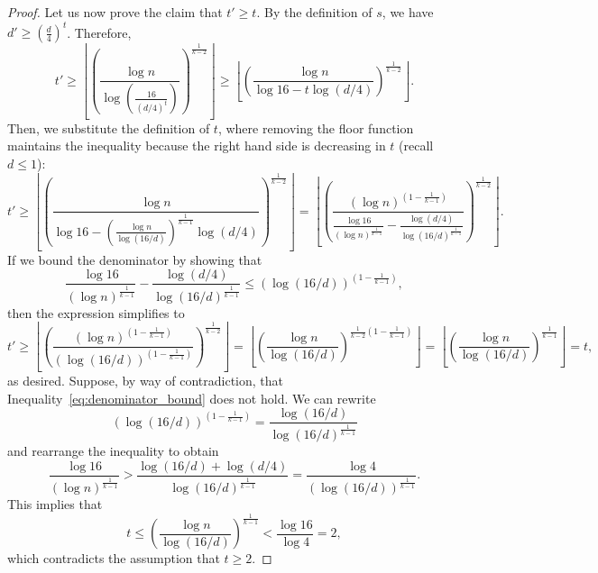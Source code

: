 \begin{theorem}
\begin{proof}
        Let us now prove the claim that $t' \geq t$.
        By the definition of $s$, we have $d' \geq \left( \frac{d}{4} \right)^t$.
        Therefore,
        \[
            t' \geq
            \left\lfloor \left(  \frac{\log n}{\log \left(\frac{16}{(d/4)^t}\right)} \right)^
            {\frac{1}{k-2}} \right\rfloor \geq
            \left\lfloor \left(  \frac{\log n}{\log 16 - t \log (d/4)} \right)^
            {\frac{1}{k-2}} \right\rfloor.
        \]
        Then, we substitute the definition of $t$, where removing the floor function
        maintains the inequality because the right hand side is decreasing in $t$ (recall $d \leq 1$):
        \begin{equation*} \label{eq:t_prime}
            t' \geq
            \left\lfloor \left(  \frac{\log n}
            {\log 16 - \left(  \frac{\log n}{\log (16/d)} \right)^{\frac{1}{k-1}}  \log (d/4)} \right)^
            {\frac{1}{k-2}} \right\rfloor
            =
            \left\lfloor \left(  \frac{(\log n)^{\left(1-\frac{1}{k-1}\right)}}
            {\frac{\log 16}{(\log n)^{\frac{1}{k-1}}} - \frac{\log (d/4)}{\log (16/d)^{\frac{1}{k-1}}} }
            \right)^{\frac{1}{k-2}} \right\rfloor.
        \end{equation*}
        If we bound the denominator by showing that
        \begin{equation} \label{eq:denominator_bound}
            \frac{\log 16}{(\log n)^{\frac{1}{k-1}}} - \frac{\log (d/4)}{\log (16/d)^{\frac{1}{k-1}}}
            \leq \left( \log (16/d) \right)^{\left( 1 - \frac{1}{k-1} \right)},
        \end{equation}
        then the expression simplifies to
        \[
            t'
            \geq \left\lfloor \left(  \frac{(\log n)^{\left(1-\frac{1}{k-1}\right)}}
            {\left( \log (16/d) \right)^{\left( 1 - \frac{1}{k-1} \right)}}
            \right)^{\frac{1}{k-2}} \right\rfloor
            = \left\lfloor \left(  \frac{\log n}
            {\log (16/d)}
            \right)^{\frac{1}{k-2}\left( 1 - \frac{1}{k-1} \right)} \right\rfloor
            = \left\lfloor \left(  \frac{\log n}{\log (16/d)} \right)^{\frac{1}{k-1}} \right\rfloor
            = t,
        \]
        as desired.
        Suppose, by way of contradiction, that Inequality~\eqref{eq:denominator_bound} does not hold.
        We can rewrite
        \[
            (\log (16/d))^{\left( 1 - \frac{1}{k-1} \right)}
            = \frac{\log (16/d)}{\log (16/d)^{\frac{1}{k-1}}}
        \]
        and rearrange the inequality to obtain
        \[
            \frac{\log 16}{(\log n)^{\frac{1}{k-1}}}
            > \frac{\log (16/d) + \log (d/4)}{\log (16/d)^{\frac{1}{k-1}}}
            = \frac{\log 4}{(\log (16/d))^{\frac{1}{k-1}}}.
        \]
        This implies that
        \[
            t
            \leq \left( \frac{\log n}{\log (16/d)} \right)^{\frac{1}{k-1}}
            < \frac{\log 16}{\log 4} = 2,
        \]
        which contradicts the assumption that $t \geq 2$.
    \end{proof}
\end{theorem}


